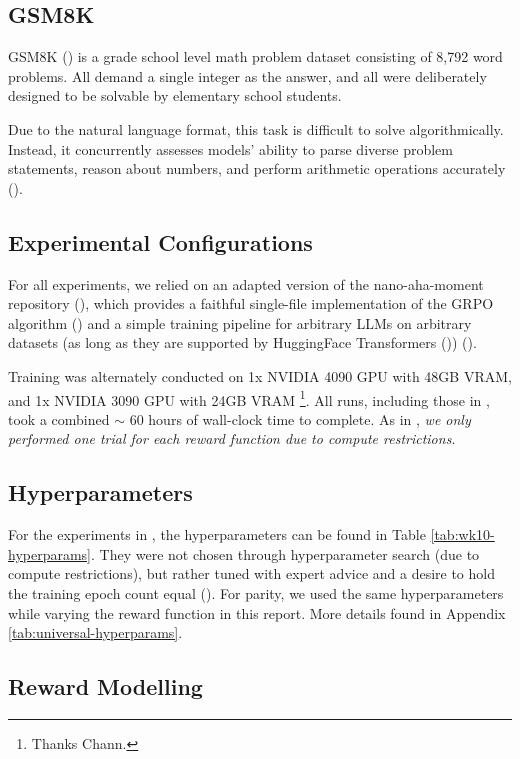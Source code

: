 \documentclass{article} %
\theoremstyle{definition}
\begin{document}
\subsection{GSM8K}

GSM8K (\cite{gsm8k}) is a grade school level math problem dataset consisting
of 8,792 word problems. All demand a single integer as the answer, and all
were deliberately designed to be solvable by elementary school students.

Due to the natural language format, this task is difficult to solve algorithmically.
Instead, it concurrently assesses models' ability to parse diverse problem statements, 
reason about numbers, and perform arithmetic operations accurately (\cite{gsm8k}).

\subsection{Experimental Configurations}

For all experiments, we relied on an adapted version of the nano-aha-moment repository (\cite{nano-aha-moment}),
which provides a faithful single-file implementation of the GRPO algorithm (\cite{grpo})
and a simple training pipeline for arbitrary LLMs on arbitrary datasets (as long
as they are supported by HuggingFace Transformers (\cite{hf-transformers})) (\cite{wk10}).

Training was alternately conducted on 1x NVIDIA 4090 GPU with 48GB VRAM,
and 1x NVIDIA 3090 GPU with 24GB VRAM \footnote{
    Thanks Chann.
}. All runs, including those in \cite{wk10}, took a combined $\sim$ 60 hours of wall-clock time to complete.
As in \cite{wk10}, \textit{we only performed one trial for each reward function 
due to compute restrictions}.

\subsection{Hyperparameters}

For the experiments in \cite{wk10}, the hyperparameters can be found in Table \ref{tab:wk10-hyperparams}.
They were not chosen through hyperparameter search (due to compute restrictions),
but rather tuned with expert advice and a desire to hold the training epoch count equal (\cite{wk10}). 
For parity, we used the same hyperparameters while varying the reward function in this report.
More details found in Appendix \ref{tab:universal-hyperparams}.

\subsection{Reward Modelling}
\end{document}
